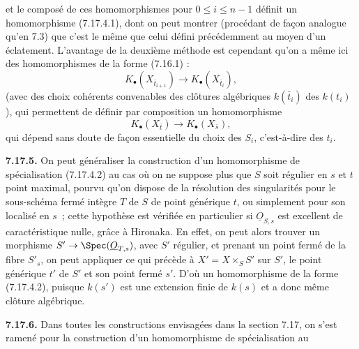 
et le
composé de ces homomorphismes pour \(0\leq i\leq n-1\) définit un homomorphisme (7.17.4.1), dont on peut montrer (procédant de façon analogue qu'en 7.3) que c'est le même que celui défini précédemment au moyen d'un éclatement. L'avantage de la deuxième méthode est cependant qu'on a même ici des homomorphismes de la forme (7.16.1) :
\[
  K_\bullet(X_{\bar t_{i+1}})\longrightarrow K_\bullet(X_{\bar t_i}),
\]
(avec des choix cohérents convenables des clôtures algébriques \(k(\bar t_i)\) des \(k(t_i)\)), qui permettent de définir par composition un homomorphisme
\begin{equation}\tag{7.17.4.2}
  K_\bullet(X_{\bar t})\longrightarrow K_\bullet(X_{\bar s}),
\end{equation}
qui dépend sans doute de façon essentielle du choix des \(S_i\), c'est-à-dire des \(t_i\).

\textbf{7.17.5.} On peut généraliser la construction d'un homomorphisme de spécialisation (7.17.4.2) au cas où on ne suppose plus que \(S\) soit régulier en \(s\) et \(t\) point maximal, pourvu qu'on dispose de la résolution des singularités pour le sous-schéma fermé intègre \(T\) de \(S\) de point générique \(t\), ou simplement pour son localisé en \(s\)~; cette hypothèse est vérifiée en particulier si \(\underline{O}_{S,s}\) est excellent de caractéristique nulle, grâce à Hironaka. En effet, on peut alors trouver un morphisme \(S'\to \Spec(\underline{O}_{T,s})\), avec \(S'\) régulier, et prenant un point fermé de la fibre \(S'_s\), on peut appliquer ce qui précède à \(X'=X\times_S S'\) sur \(S'\), le point générique \(t'\) de \(S'\) et son point fermé \(s'\). D'où un homomorphisme de la forme (7.17.4.2), puisque \(k(s')\) est une extension finie de \(k(s)\) et a donc même clôture algébrique.

\textbf{7.17.6.} Dans toutes les constructions envisagées dans la section 7.17, on s'est ramené pour la construction d'un homomorphisme de spécialisation au
